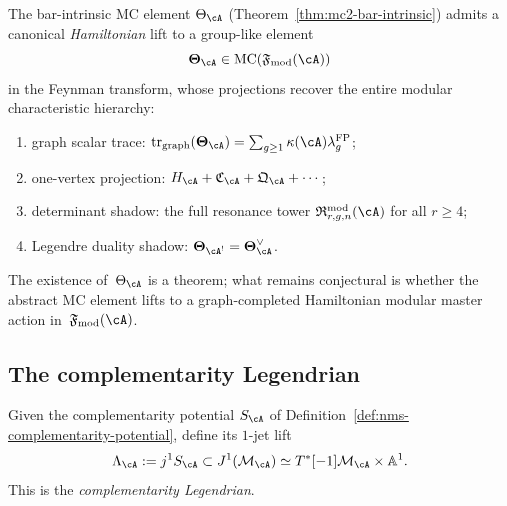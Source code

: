 \begin{conjecture}
\label{conj:nms-graph-completed-master-element}
%
The bar-intrinsic MC element $\Theta_\cA$ (Theorem~\ref{thm:mc2-bar-intrinsic}) admits a canonical \emph{Hamiltonian} lift to a group-like element
\[
\boldsymbol\Theta_{\cA}\in \mathrm{MC}(\mathfrak F_{\mathrm{mod}}(\cA))
\]
in the Feynman transform, whose projections recover the entire modular characteristic hierarchy:
\begin{enumerate}[label=\textup{(\roman*)}]
\item graph scalar trace:
$\operatorname{tr}_{\mathrm{graph}}(\boldsymbol\Theta_{\cA})
=\sum_{g\ge 1}\kappa(\cA)\lambda_g^{\mathrm{FP}}$;
\item one-vertex projection: $H_{\cA}+\mathfrak C_{\cA}+\mathfrak Q_{\cA}+\cdots$;
\item determinant shadow: the full resonance tower $\mathfrak R^{\mathrm{mod}}_{r,g,n}(\cA)$ for all $r\ge 4$;
\item Legendre duality shadow: $\boldsymbol\Theta_{\cA^!}=\boldsymbol\Theta_{\cA}^{\vee}$.
\end{enumerate}
The existence of~$\Theta_\cA$ is a theorem; what remains conjectural is whether the abstract MC element lifts to a graph-completed Hamiltonian modular master action in~$\mathfrak F_{\mathrm{mod}}(\cA)$.
\end{conjecture}

\subsection{The complementarity Legendrian}
\label{subsec:nms-complementarity-legendrian}

\begin{definition}
\label{def:nms-complementarity-legendrian}
%
Given the complementarity potential $S_{\cA}$ of Definition~\ref{def:nms-complementarity-potential}, define its $1$-jet lift
\[
\Lambda_{\cA}:=j^1S_{\cA}
\subset J^1(\mathcal M_{\cA})
\simeq T^*[-1]\mathcal M_{\cA}\times \mathbb A^1.
\]
This is the \emph{complementarity Legendrian}.
\end{definition}

